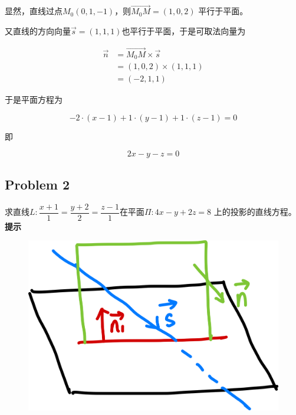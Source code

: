 \documentclass[
	11pt, %
	a4paper, %
]{WhuSakuraBook}
\begin{document}
    显然，直线过点\(M_{0}\left(0,1,-1\right)\)，则\(\overrightarrow{M_{0}M} = \left(1,0,2\right)\)
    平行于平面。

    又直线的方向向量\(\overrightarrow{s} = \left(1,1,1\right)\)也平行于平面，于是可取法向量为

    \begin{align*}
        \overrightarrow{n} &= \overrightarrow{M_{0}M} \times \overrightarrow{s} \\
        &= \left(1,0,2\right) \times \left(1,1,1\right) \\
        &= \left(-2,1,1\right)
    \end{align*}

    于是平面方程为

    \[
        -2 \cdot \left(x-1\right) + 1 \cdot \left(y-1\right) + 1 \cdot \left(z-1\right) = 0
    \]

    即

    \[
        2x-y-z=0
    \]

\subsection{Problem 2}

    求直线$L: \dfrac{x+1}{1}=\dfrac{y+2}{2}=\dfrac{z-1}{1}$在平面\(\Pi: 4x-y + 2z = 8\)
    上的投影的直线方程。
    \\

    \textbf{提示}
    \\

    \begin{figure}
        \centering
        \includegraphics[scale=0.06]{"Chapter 08 images/pic20.png"}
        \label{pic20}
    \end{figure}
\end{document}
